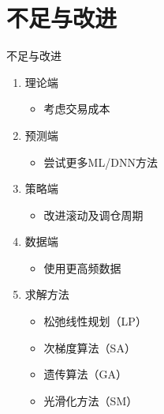 \documentclass[CJK,aspectratio=169]{beamer}  %
\begin{document}
\section{不足与改进}
\begin{frame}{不足与改进}
	\begin{enumerate}
	\item 理论端
		\begin{itemize}
			\item 考虑交易成本
		\end{itemize}
		
	\item  预测端
		\begin{itemize}
			\item 尝试更多ML/DNN方法
		\end{itemize}
	\item  策略端
		\begin{itemize}
			\item 改进滚动及调仓周期
		\end{itemize}
	\item  数据端
		\begin{itemize}
			\item 使用更高频数据
		\end{itemize}
	\item  求解方法
		\begin{itemize}
			\item 松弛线性规划（LP）
			\item 次梯度算法（SA）
			\item 遗传算法（GA）
			\item 光滑化方法（SM）
		\end{itemize}
	\end{enumerate}
\end{frame}
\end{document}
